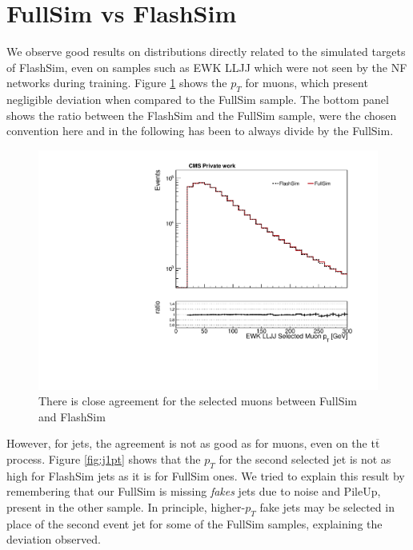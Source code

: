 \section{FullSim vs FlashSim}

We observe good results on distributions directly related to the simulated targets of FlashSim, even on samples such as EWK LLJJ which were not seen by the NF networks during training. Figure \ref{fig:selmuonpt} shows the $p_T$ for muons, which present negligible deviation when compared to the FullSim sample. The bottom panel shows the ratio between the FlashSim and the FullSim sample, were the chosen convention here and in the following has been to always divide by the FullSim.

\begin{figure}
    \centering
    \includegraphics[width=\linewidth]{gfx/ch6/EWK_LLJJ_SelectedMuon_pt____log.pdf}
    \caption[Selected muon $p_T$]{There is close agreement for the selected muons between FullSim and FlashSim}
    \label{fig:selmuonpt}
\end{figure}

However, for jets, the agreement is not as good as for muons, even on the t$\overline{\text{t}}$ process. Figure \ref{fig:j1pt} shows that the $p_T$ for the second selected jet is not as high for FlashSim jets as it is for FullSim ones. We tried to explain this result by remembering that our FullSim is missing \emph{fakes} jets due to noise and PileUp, present in the other sample. In principle, higher-$p_T$ fake jets may be selected in place of the second event jet for some of the FullSim samples, explaining the deviation observed. 

